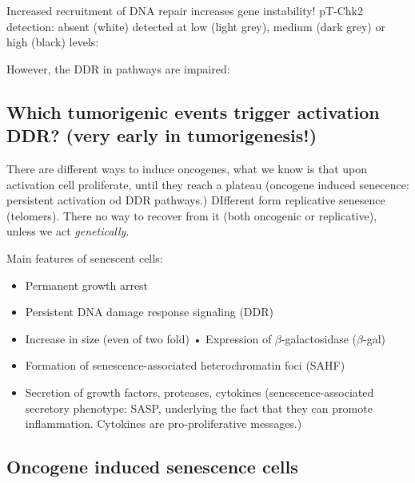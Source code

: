 Increased recruitment of DNA repair increases gene instability! pT-Chk2
detection: absent (white) detected at low (light grey), medium (dark
grey) or high (black) levels:

However, the DDR in pathways are impaired:

\hypertarget{which-tumorigenic-events-trigger-activation-ddr-very-early-in-tumorigenesis}{%
\subsection{Which tumorigenic events trigger activation DDR? (very early
in
tumorigenesis!)}\label{which-tumorigenic-events-trigger-activation-ddr-very-early-in-tumorigenesis}}

There are different ways to induce oncogenes, what we know is that upon
activation cell proliferate, until they reach a plateau (oncogene
induced senecence: persistent activation od DDR pathways.) DIfferent
form replicative senesence (telomers). There no way to recover from it
(both oncogenic or replicative), unless we act \emph{genetically}.


Main features of senescent cells: 
\begin{itemize}
\item Permanent growth arrest 
\item Persistent DNA damage response signaling (DDR) 
\item Increase in size (even of two
fold) • Expression of $\beta$-galactosidase ($\beta$-gal) 
\item Formation of
senescence-associated heterochromatin foci (SAHF) 
\item Secretion of growth
factors, proteases, cytokines (senescence-associated secretory
phenotype: SASP, underlying the fact that they can promote inflammation.
Cytokines are pro-proliferative messages.)
\end{itemize}


\hypertarget{oncogene-induced-senescence-cells}{%
\subsection{Oncogene induced senescence
cells}\label{oncogene-induced-senescence-cells}}

